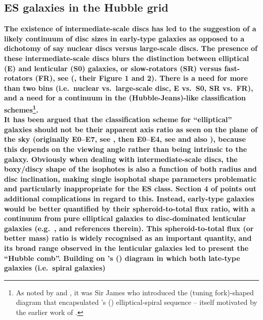 \documentclass[useAMS,usenatbib,article]{mnras}
\begin{document}
\subsection{ES galaxies in the Hubble grid}
{\bf The existence of intermediate-scale discs has led to the suggestion of a likely continuum of disc sizes in early-type galaxies 
\citep{simiendevaucouleurs1986,capaccioli1988,bender1989,simienmichard1990,scorza1993,scorzavandenBosch1998} 
as opposed to a dichotomy of say nuclear discs versus large-scale discs.  
The presence of these intermediate-scale discs blurs the distinction between elliptical (E) and lenticular (S0) galaxies, 
or slow-rotators (SR) versus fast-rotators (FR), 
see \citeauthor{cappellari2011kmdr} (\citeyear{cappellari2011kmdr}, their Figure 1 and 2).   
There is a need for more than two bins (i.e.~nuclear vs.~large-scale disc, E vs.~S0, SR vs.~FR), 
and a need for a continuum in the (Hubble-Jeans)-like classification 
schemes\footnote{As noted by \cite{vandenbergh1997} and \cite{sandage2005}, 
it was Sir James \cite{jeans1928} who introduced the (tuning fork)-shaped diagram that encapsulated \citeauthor{Hubble1926}'s (\citeyear{Hubble1926}) 
elliptical-spiral sequence -- itself motivated by the earlier work of \cite{Jeans1919}.}.     \\
It has been argued that the classification scheme for ``elliptical'' galaxies should not be 
their apparent axis ratio as seen on the plane of the sky (originally E0--E7, see \citealt{hubble1936,sandage1961}, 
then E0--E4, see \citealt{liller1966} and also \citealt{gorbachev1970}), 
because this depends on the viewing angle rather than being intrinsic to the galaxy.  
Obviously when dealing with intermediate-scale discs, 
the boxy/discy shape of the isophotes is also a function of both radius and disc inclination, 
making single isophotal shape parameters problematic and particularly inappropriate for the ES class.  
Section 4 of \cite{kormendybender1996} points out additional complications in regard to this.  
Instead, early-type galaxies would be better quantified by their spheroid-to-total flux ratio, 
with a continuum from pure elliptical galaxies to disc-dominated lenticular galaxies (e.g.~\citealt{capaccioli1988}, and references therein).   
This spheroid-to-total flux (or better mass) ratio is widely recognised as an important quantity, 
and its broad range observed in the lenticular galaxies led \cite{cappellari2011kmdr} to present the ``Hubble comb''.   
Building on \citeauthor{vandenbergh1976}'s (\citeyear{vandenbergh1976}) diagram in which both late-type galaxies (i.e.~spiral galaxies) 
}
\end{document}
